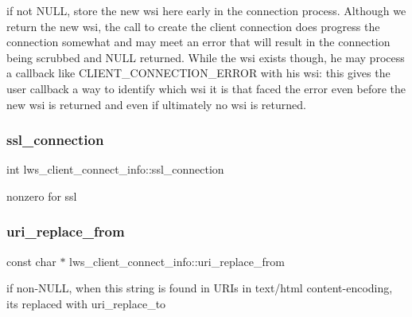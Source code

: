 if not N\+U\+LL, store the new wsi here early in the connection process. Although we return the new wsi, the call to create the client connection does progress the connection somewhat and may meet an error that will result in the connection being scrubbed and N\+U\+LL returned. While the wsi exists though, he may process a callback like C\+L\+I\+E\+N\+T\+\_\+\+C\+O\+N\+N\+E\+C\+T\+I\+O\+N\+\_\+\+E\+R\+R\+OR with his wsi\+: this gives the user callback a way to identify which wsi it is that faced the error even before the new wsi is returned and even if ultimately no wsi is returned. \mbox{\label{structlws__client__connect__info_a9862297827639238a7a0b4054c3ddf3d}} 
\subsubsection{\texorpdfstring{ssl\+\_\+connection}{ssl\_connection}}
{\footnotesize\ttfamily int lws\+\_\+client\+\_\+connect\+\_\+info\+::ssl\+\_\+connection}

nonzero for ssl \mbox{\label{structlws__client__connect__info_acb68c628d1c0a17880c6159192a3bbb4}} 
\subsubsection{\texorpdfstring{uri\+\_\+replace\+\_\+from}{uri\_replace\_from}}
{\footnotesize\ttfamily const char $\ast$ lws\+\_\+client\+\_\+connect\+\_\+info\+::uri\+\_\+replace\+\_\+from}

if non-\/\+N\+U\+LL, when this string is found in U\+R\+Is in text/html content-\/encoding, it\textquotesingle{}s replaced with uri\+\_\+replace\+\_\+to \mbox{\label{structlws__client__connect__info_ad4a7803f2d9e52048ff0226e84c2bdcf}} 
